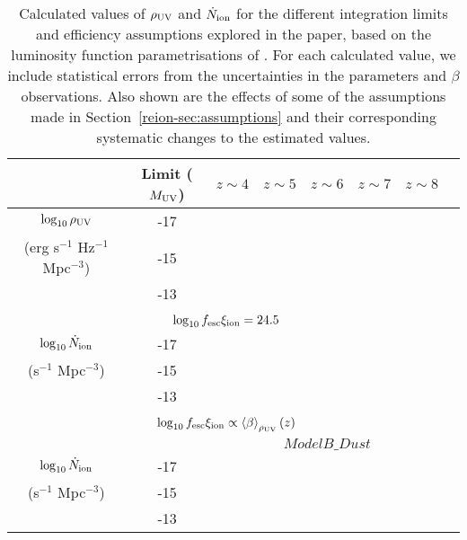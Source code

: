 \begin{table}
  \caption{Calculated values of $\rho_{\rm{UV}}$ and $\dot{N}_{\rm{ion}}$ for the different integration limits and efficiency assumptions explored in the paper, based on the luminosity function parametrisations of \citet{2015ApJ...803...34B}. For each calculated value, we include statistical errors from the uncertainties in the \citet{Schechter:1976gl} parameters and $\beta$ observations. Also shown are the effects of some of the assumptions made in Section~\ref{reion-sec:assumptions} and their corresponding systematic changes to the estimated values.}	
  \scriptsize
  \begin{tabular}{cc|cccccc}
  \hline
   & Limit ($M_{\rm{UV}}$) & $z\sim4$ & $z\sim5$ & $z\sim6$ & $z\sim7$ & $z\sim8$ & \\
   \hline
  $\log_{10} \rho_{\rm{UV}}$ 							& -17 &  \\
   (erg s$^{-1}$ Hz$^{-1}$ Mpc$^{-3}$)	& -15 &  \\
																& -13 &  \\

	 \multicolumn{7}{c}{}\\
	 \multicolumn{7}{c}{$\log_{10}f_{\rm{esc}}\xi_{\rm{ion}} = 24.5$}\\\hline
$\log_{10} \dot{N}_{\rm{ion}}$	 		& -17 &  \\
(s$^{-1}$ Mpc$^{-3}$) 				& -15 &  \\
												& -13 &  \\
												
	 \multicolumn{7}{c}{}\\
	 \multicolumn{7}{c}{$\log_{10}f_{\rm{esc}}\xi_{\rm{ion}} \propto \left \langle \beta  \right \rangle_{\rho_{\rm{UV}}}(z)$}\\ \hline
	
	  & & \multicolumn{5}{c}{$ModelB\_Dust$}\\
	  
$\log_{10} \dot{N}_{\rm{ion}}$	 		& -17 &  \\
(s$^{-1}$ Mpc$^{-3}$) 				& -15 &  \\
												& -13 &  \\
												

\end{tabular}
\end{table}
